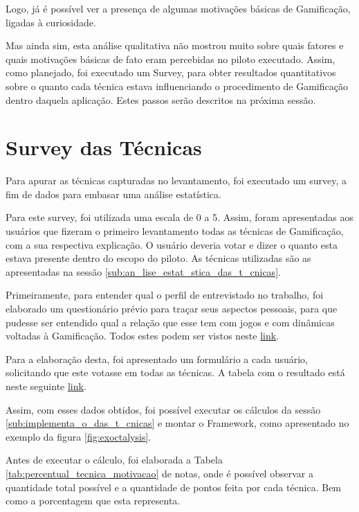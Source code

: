 Logo, já é possível ver a presença de algumas motivações básicas de Gamificação, ligadas
à curiosidade.

Mas ainda sim, esta análise qualitativa não mostrou muito sobre quais fatores
e quais motivações básicas de fato eram percebidas no piloto executado. Assim,
como planejado, foi executado um Survey, para obter resultados quantitativos sobre
o quanto cada técnica estava influenciando o procedimento de Gamificação dentro
daquela aplicação. Estes passos serão descritos na próxima sessão.

\section{Survey das Técnicas}
\label{sec:gamifição}
Para apurar as técnicas capturadas no levantamento, foi executado um survey, a fim de dados para
embasar uma análise estatística.

Para este survey, foi utilizada uma escala de 0 a 5. Assim, foram apresentadas aos usuários
que fizeram o primeiro levantamento todas as técnicas de Gamificação, com a sua
respectiva explicação. O usuário deveria votar e dizer o quanto esta estava presente
dentro do escopo do piloto. As técnicas utilizadas são as apresentadas na sessão
\ref{sub:an_lise_estat_stica_das_t_cnicas}.

Primeiramente, para entender qual o perfil de entrevistado no trabalho, foi elaborado
um questionário prévio para traçar seus aspectos pessoais,
para que pudesse ser entendido qual a relação que esse tem com jogos e com dinâmicas
voltadas à Gamificação. Todos estes podem ser vistos neste \href{https://docs.google.com/spreadsheets/d/1galTU00NPQKaU7GRsYOciLhD0ZzIKH9BbJWyRdC3gbs/edit?usp=sharing}{link}.


Para a elaboração desta, foi apresentado um formulário a cada usuário, solicitando
que este votasse em todas as técnicas. A tabela com o resultado está neste seguinte
\href{https://docs.google.com/spreadsheets/d/1qROpsDaz32PZtkvCvmFTrqLVLgqhHR9F-Q5rcQ_pwys/edit?usp=sharing}{link}.

Assim, com esses dados obtidos, foi possível executar os cálculos da sessão \ref{sub:implementa_o_das_t_cnicas}
e montar o Framework, como apresentado no exemplo da figura \ref{fig:exoctalysis}.

Antes de executar o cálculo, foi elaborada a Tabela \ref{tab:percentual_tecnica_motivacao}
 de notas, onde é possível
observar a quantidade total possível e a quantidade de pontos feita por cada técnica.
Bem como a porcentagem que esta representa.

